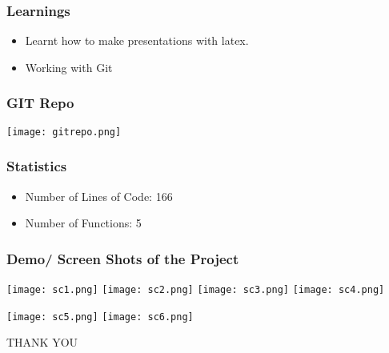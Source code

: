 \documentclass[14pt]{beamer}
\begin{document}
 \begin{frame}
        \frametitle{Learnings}
	\begin{itemize}
	    \item Learnt how to make presentations with latex.
	   \item Working with Git
	\end{itemize}
    \end{frame}
	
  \begin{frame}
	\frametitle{GIT Repo}
\begin{center}
\texttt{[image: gitrepo.png]}
\end{center}
\end{frame}
 \begin{frame}
	\frametitle{Statistics}
        \begin{itemize}
	     \item Number of Lines of Code: 166
	     \item Number of Functions: 5
        \end{itemize}
\end{frame}

 \begin{frame}
	\frametitle{Demo/ Screen Shots of the Project}
	\begin{center}
		\texttt{[image: sc1.png]}
		\texttt{[image: sc2.png]}
		\texttt{[image: sc3.png]}
		\texttt{[image: sc4.png]}
	\end{center}	
\end{frame}

\begin{frame}
	\begin{center}
		\texttt{[image: sc5.png]}
		\texttt{[image: sc6.png]}
	\end{center}
\end{frame}

 \begin{frame}
	\begin{center}
	    THANK YOU
	\end{center}
    \end{frame}
\enddocument
\end{document}
